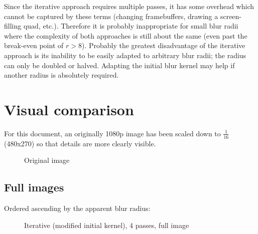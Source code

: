 \documentclass[english,fleqn,10pt,twocolumn]{article}
\begin{document}
Since the iterative approach requires multiple passes, it has some overhead which cannot be captured by these terms (changing framebuffers, drawing a screen-filling quad, etc.). Therefore it is
probably inappropriate for small blur radii where the complexity of both approaches is still about the same (even past the break-even point of $r > 8$). Probably the greatest disadvantage of the
iterative approach is its inability to be easily adapted to arbitrary blur radii; the radius can only be doubled or halved. Adapting the initial blur kernel may help if another radius is absolutely
required.


\pagebreak

\section{Visual comparison}

For this document, an originally 1080p image has been scaled down to $\frac 1{16}$ (480x270) so that details are more clearly visible.

\begin{figure}[H]
    \centering {}
    \caption{Original image}
\end{figure}

\subsection{Full images}

Ordered ascending by the apparent blur radius:

\begin{figure}[H]
    \centering {}
    \caption{Iterative (modified initial kernel), 4 passes, full image}
\end{figure}
\end{document}
